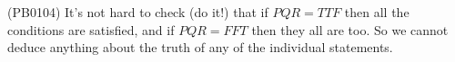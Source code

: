 (PB0104) It's not hard to check (do it!) that if $PQR=TTF$ then all the conditions are satisfied, and if $PQR=FFT$ then they all are too. So we cannot deduce anything about the truth of any of the individual statements.
